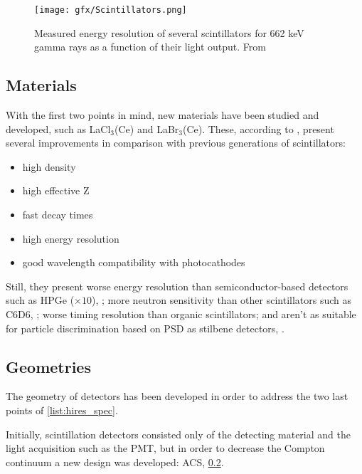 \begin{figure}[h!]
    \centering
    \texttt{[image: gfx/Scintillators.png]}
    \caption{Measured energy resolution of several scintillators for 662 keV gamma rays as a function of their light output. From \cite{Moses2002Jul}}%
    \label{fig:Scintillator}%
\end{figure}

\subsection{Materials}\label{ssec:materials}

With the first two points in mind, new materials have been studied and developed, such as LaCl$_3$(Ce) and LaBr$_3$(Ce). These, according to \cite[p.~251]{Knoll4}, present several improvements in comparison with previous generations of scintillators:
\begin{itemize}
    \item high density
    \item high effective Z
    \item fast decay times
    \item high energy resolution
    \item good wavelength compatibility with photocathodes
\end{itemize}

Still, they present worse energy resolution than semiconductor-based detectors such as \ac{HPGe} (\approx$\times10$), \cite{}; more neutron sensitivity than other scintillators such as C6D6, \cite{Borella2007Jul}; worse timing resolution than organic scintillators; and aren't as suitable for particle discrimination based on \ac{PSD} as stilbene detectors, \cite{Becchetti2018Nov}.

\subsection{Geometries}

The geometry of detectors has been developed in order to address the two last points of \ref{list:hires_spec}.

Initially, scintillation detectors consisted only of the detecting material and the light acquisition such as the \ac{PMT}, but in order to decrease the Compton continuum a new design was developed: \ac{ACS}, \ref{}.

